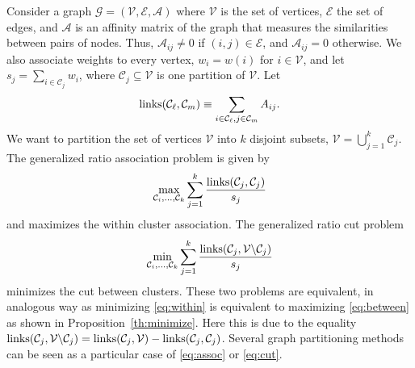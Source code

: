 \documentclass[aps,preprint,nofootinbib,floatfix]{revtex4-1}
\newcommand\C{{\mathcal{C}}}
\begin{document}
Consider a graph $\mathcal{G} = (\mathcal{V}, \mathcal{E}, \mathcal{A})$
where $\mathcal{V}$ is the set of vertices, $\mathcal{E}$ the set of edges,
and $\mathcal{A}$ is an affinity matrix of the graph 
that measures the 
similarities between pairs of nodes. Thus, $\mathcal{A}_{ij} \ne 0$
if $(i,j) \in \mathcal{E}$, and $\mathcal{A}_{ij} = 0$ otherwise.
We also associate weights to every vertex, 
$w_i = w(i)$ for $i \in \mathcal{V}$, and let $s_j = \sum_{ i \in \C_j} w_i$,
where $\C_j \subseteq \mathcal{V}$ is one partition of $\mathcal{V}$.
Let
\begin{equation}
\textnormal{links}(\C_\ell, \C_m) \equiv 
\sum_{i\in \C_\ell, j\in \C_m } A_{ij} .
\end{equation}
We want to partition the set of vertices $\mathcal{V}$ into $k$ disjoint
subsets, $\mathcal{V} = \bigcup_{j=1}^k \C_j $. 
The generalized ratio association problem is given by
\begin{equation}
\label{eq:assoc}
\max_{\C_i,\dots,\C_k} \sum_{j=1}^k \dfrac{\textnormal{links}(\C_j,\C_j)}{s_j}
\end{equation}
and maximizes the within cluster association.
The generalized ratio cut problem
\begin{equation}
\label{eq:cut}
\min_{\C_i,\dots,\C_k} \sum_{j=1}^k
\dfrac{\textnormal{links}(\C_j,\mathcal{V} \backslash \C_j)}{s_j}
\end{equation}
minimizes the cut between clusters. These two problems are equivalent,
in analogous way as minimizing \eqref{eq:within} is equivalent to
maximizing \eqref{eq:between} as shown in Proposition~\ref{th:minimize}.
Here this is due to the equality
$\textnormal{links}(\C_j,\mathcal{V} \backslash \C_j)=
\textnormal{links}(\C_j,\mathcal{V}) - \textnormal{links}(\C_j,\C_j)$.
Several graph partitioning methods 
\cite{Kernighan,Malik,Chan,Yu}
can be seen as a particular case of \eqref{eq:assoc} or \eqref{eq:cut}.
\end{document}
